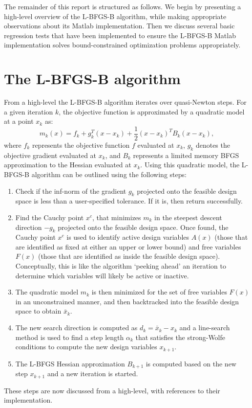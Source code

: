 \documentclass[11pt]{article}
\begin{document}
The remainder of this report is structured as follows.
We begin by presenting a high-level overview of the
L-BFGS-B algorithm, while making appropriate observations
about its Matlab implementation. Then we discuss several
basic regression tests that have been implemented to
ensure the L-BFGS-B Matlab implementation solves
bound-constrained optimization problems appropriately.

\section{The L-BFGS-B algorithm}

From a high-level the L-BFGS-B algorithm iterates over
quasi-Newton steps. For a given iteration $k$,
the objective function is approximated by a quadratic model
at a point $x_k$ as:
%
\begin{equation}
m_k(x) = f_k + g^T_k(x-x_k) + \frac12 (x-x_k)^T B_k (x-x_k),
\label{eq:quadratic}
\end{equation}
%
where $f_k$ represents the objective function $f$ evaluated
at $x_k$, $g_k$ denotes the objective gradient evaluated at
$x_k$, and $B_k$ represents a limited memory BFGS approximation
to the Hessian evaluated at $x_k$. Using this quadratic model,
the L-BFGS-B algorithm can be outlined using the following steps:
%
\begin{enumerate}
\item Check if the inf-norm of the gradient $g_k$ projected onto
the feasible design space is less than a user-specified tolerance.
If it is, then return successfully.
\item Find the Cauchy point $x^c$, that minimizes $m_k$ in
the  steepest descent direction $-g_k$ projected onto the
feasible design space. Once found, the Cauchy point $x^c$
is used to identify active design variables $A(x)$ (those that
are identified as fixed at either an upper or lower bound)
and free variables $F(x)$ (those that are identified as inside the
feasible design space). Conceptually, this is like the algorithm
`peeking ahead' an iteration to determine which variables will
likely be active or inactive.
\item The quadratic model $m_k$ is then minimized for the set
of free variables $F(x)$ in an unconstrained manner, and then
backtracked into the feasible design space to obtain
$\bar{x}_k$.
\item The new search direction is computed as $d_k = \bar{x}_k - x_k$
and a line-search method is used to find a step length $\alpha_k$
that satisfies the strong-Wolfe conditions to compute the new
design variables $x_{k+1}$.
\item The L-BFGS Hessian approximation $B_{k+1}$ is computed based
on the new step $x_{k+1}$ and a new iteration is started.
\end{enumerate}
%
These steps are now discussed from a high-level, with references
to their implementation.
\end{document}
